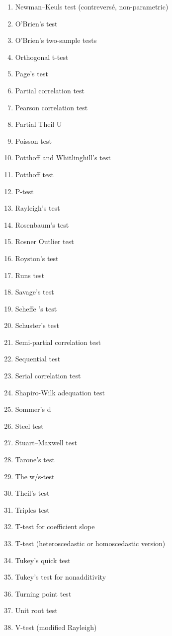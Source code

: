 \begin{itemize}
\begin{multicols}{3}
\begin{enumerate}
			\item Newman–Keuls test (contreversé, non-parametric)
			\item O'Brien's test
			\item O'Brien's two-sample tests
			\item Orthogonal t-test 
			\item Page's test
			\item Partial correlation test
			\item Pearson correlation test
			\item Partial Theil U
			\item Poisson test
			\item Potthoff and Whitlinghill's test
			\item Potthoff test
			\item P-test
			\item Rayleigh's test
			\item Rosenbaum's test
			\item Rosner Outlier test
			\item Royston's test
			\item Runs test
			\item Savage's test
			\item Scheffe 's test
			\item Schuster's test
			\item Semi-partial correlation test
			\item Sequential test
			\item Serial correlation test
			\item Shapiro-Wilk adequation test 
			\item Sommer's d 
			\item Steel test
			\item Stuart–Maxwell test
			\item Tarone's test
			\item The w/s-test
			\item Theil's test
			\item Triples test
			\item T-test for coefficient slope
			\item T-test (heteroscedastic or homoscedastic version)
			\item Tukey's quick test
			\item Tukey's test for nonadditivity
			\item Turning point test
			\item Unit root test
			\item V-test (modified Rayleigh)

\end{enumerate}
\end{multicols}
\end{itemize}
